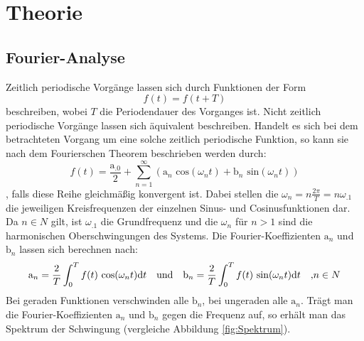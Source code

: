 
\section{Theorie}
\label{sec:Theorie}

\subsection{Fourier-Analyse}\label{subsec:F-A}
Zeitlich periodische Vorgänge lassen sich durch Funktionen der Form
\[
f(t) = f(t+T)
\]
beschreiben, wobei $T$ die Periodendauer des Vorganges ist.
Nicht zeitlich periodische Vorgänge lassen sich äquivalent beschreiben.
Handelt es sich bei dem betrachteten Vorgang um eine solche zeitlich periodische Funktion, so kann sie nach dem Fourierschen Theorem beschrieben werden durch:
\begin{equation}
f(t) = \frac{\mathrm{a}_.0}{2} + \sum_{n=1}^\infty\left(\mathrm{a}_n\text{ cos}(\omega_nt)+\mathrm{b}_n\text{ sin}(\omega_nt)\right)
\end{equation}
, falls diese Reihe gleichmäßig konvergent ist. 
Dabei stellen die $\omega_n=n\frac{2\pi}{T}=n\omega_.1$ die jeweiligen Kreisfrequenzen der einzelnen Sinus- und Cosinusfunktionen dar. Da $n\in N$ gilt, ist $\omega_.1$ die Grundfrequenz und die $\omega_n$ für $n>1$ sind die harmonischen Oberschwingungen des Systems.
Die Fourier-Koeffizienten $\mathrm{a}_n$ und $\mathrm{b}_n$ lassen sich berechnen nach:
\begin{equation}
\mathrm{a}_n = \frac{2}{T}\int_0^Tf(t)\text{ cos}(\omega_nt)\mathrm{d}t\text{\hspace{1em}und\hspace{1em}}\mathrm{b}_n=\frac{2}{T}\int_0^Tf(t)\text{ sin}(\omega_nt)\mathrm{d}t\text{\hspace{1em},}n\in N
\end{equation}   
Bei geraden Funktionen verschwinden alle $\mathrm{b}_n$, bei ungeraden alle $\mathrm{a}_n$. 
Trägt man die Fourier-Koeffizienten $\mathrm{a}_n$ und $\mathrm{b}_n$ gegen die Frequenz auf, so erhält man das Spektrum der Schwingung (vergleiche Abbildung \ref{fig:Spektrum}).
